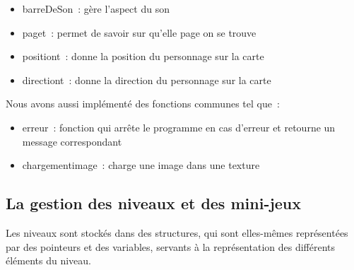 \documentclass[12pt,a4paper]{article}
\begin{document}
            \begin{itemize}
                \item barreDeSon~: gère l’aspect du son
                \item page\textunderscore t~: permet de savoir sur qu'elle page on se trouve
                \item position\textunderscore t~: donne la position du personnage sur la carte
                \item direction\textunderscore t~: donne la direction du personnage sur la carte\\
            \end{itemize}

            Nous avons aussi implémenté des fonctions communes tel que~:\\
            
            \begin{itemize}
                \item erreur~: fonction qui arrête le programme en cas d’erreur et retourne un message correspondant
                \item chargement\textunderscore image~: charge une image dans une texture
            \end{itemize}

        \newpage
        
         \subsection{La gestion des niveaux et des mini-jeux}   
            \tabto{1cm} Les niveaux sont stockés dans des structures, qui sont elles-mêmes représentées par des pointeurs et des variables, servants à la représentation des différents éléments du niveau.
\end{document}
